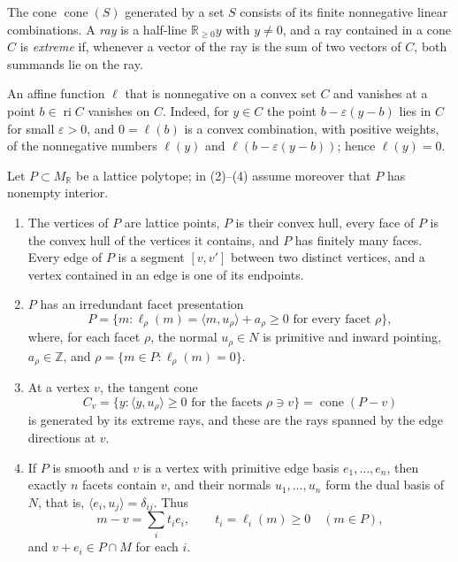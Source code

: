 The cone $\operatorname{cone}(S)$ generated by a set $S$ consists of its finite nonnegative linear combinations. A \emph{ray} is a half-line $\mathbb R_{\geq0}y$ with $y\neq0$, and a ray contained in a cone $C$ is \emph{extreme} if, whenever a vector of the ray is the sum of two vectors of $C$, both summands lie on the ray.

An affine function $\ell$ that is nonnegative on a convex set $C$ and vanishes at a point $b\in\operatorname{ri}C$ vanishes on $C$. Indeed, for $y\in C$ the point $b-\varepsilon(y-b)$ lies in $C$ for small $\varepsilon>0$, and $0=\ell(b)$ is a convex combination, with positive weights, of the nonnegative numbers $\ell(y)$ and $\ell(b-\varepsilon(y-b))$; hence $\ell(y)=0$.

\begin{lemma}\label{lem:polytope-facets-and-vertex-cones}
Let $P\subset M_{\mathbb R}$ be a lattice polytope; in \textup{(2)}--\textup{(4)} assume moreover that $P$ has nonempty interior.
\begin{enumerate}
\item The vertices of $P$ are lattice points, $P$ is their convex hull, every face of $P$ is the convex hull of the vertices it contains, and $P$ has finitely many faces. Every edge of $P$ is a segment $[v,v']$ between two distinct vertices, and a vertex contained in an edge is one of its endpoints.
\item $P$ has an irredundant facet presentation
\[
 P=\{m:\ell_\rho(m)=\langle m,u_\rho\rangle+a_\rho\geq0
                                      \text{ for every facet }\rho\},
\]
where, for each facet $\rho$, the normal $u_\rho\in N$ is primitive and inward pointing, $a_\rho\in\mathbb Z$, and $\rho=\{m\in P:\ell_\rho(m)=0\}$.
\item At a vertex $v$, the tangent cone
\[
 C_v=\{y:\langle y,u_\rho\rangle\geq0
                                      \text{ for the facets }\rho\ni v\}
     =\operatorname{cone}(P-v)
\]
is generated by its extreme rays, and these are the rays spanned by the edge directions at $v$.
\item If $P$ is smooth and $v$ is a vertex with primitive edge basis $e_1,\ldots,e_n$, then exactly $n$ facets contain $v$, and their normals $u_1,\ldots,u_n$ form the dual basis of $N$, that is, $\langle e_i,u_j\rangle=\delta_{ij}$. Thus
\[
 m-v=\sum_i t_i e_i,\qquad t_i=\ell_i(m)\geq0\quad(m\in P),
\]
and $v+e_i\in P\cap M$ for each $i$.
\end{enumerate}
\end{lemma}
